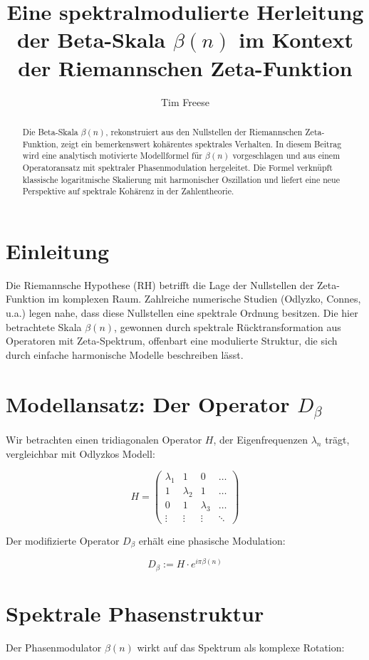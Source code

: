 \documentclass[11pt]{article}
\title{\textbf{Eine spektralmodulierte Herleitung der Beta-Skala \(\beta(n)\) im Kontext der Riemannschen Zeta-Funktion}}
\author[1]{Tim Freese}
\affil[1]{\small\textit{freese-math.github.io — Forschungsplattform zur spektralen Sichtweise der RH}}
\date{}
\begin{document}
\maketitle

\begin{abstract}
Die Beta-Skala \(\beta(n)\), rekonstruiert aus den Nullstellen der Riemannschen Zeta-Funktion, zeigt ein bemerkenswert kohärentes spektrales Verhalten. In diesem Beitrag wird eine analytisch motivierte Modellformel für \(\beta(n)\) vorgeschlagen und aus einem Operatoransatz mit spektraler Phasenmodulation hergeleitet. Die Formel verknüpft klassische logaritmische Skalierung mit harmonischer Oszillation und liefert eine neue Perspektive auf spektrale Kohärenz in der Zahlentheorie.
\end{abstract}

\section{Einleitung}
Die Riemannsche Hypothese (RH) betrifft die Lage der Nullstellen der Zeta-Funktion im komplexen Raum. Zahlreiche numerische Studien (Odlyzko, Connes, u.a.) legen nahe, dass diese Nullstellen eine spektrale Ordnung besitzen. Die hier betrachtete Skala \(\beta(n)\), gewonnen durch spektrale Rücktransformation aus Operatoren mit Zeta-Spektrum, offenbart eine modulierte Struktur, die sich durch einfache harmonische Modelle beschreiben lässt.

\section{Modellansatz: Der Operator \texorpdfstring{$D_\beta$}{D beta}}
Wir betrachten einen tridiagonalen Operator \(H\), der Eigenfrequenzen \(\lambda_n\) trägt, vergleichbar mit Odlyzkos Modell:

\[
H = \begin{pmatrix}
\lambda_1 & 1 & 0 & \dots \\
1 & \lambda_2 & 1 & \dots \\
0 & 1 & \lambda_3 & \dots \\
\vdots & \vdots & \vdots & \ddots
\end{pmatrix}
\]

Der modifizierte Operator \( D_\beta \) erhält eine phasische Modulation:

\[
D_\beta := H \cdot e^{i\pi \beta(n)}
\]

\section{Spektrale Phasenstruktur}
Der Phasenmodulator \(\beta(n)\) wirkt auf das Spektrum als komplexe Rotation:
\end{document}
